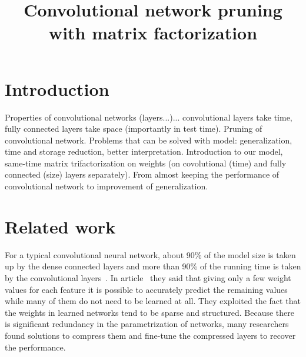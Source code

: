 \documentclass{article} %
\title{Convolutional network pruning with matrix factorization}
\begin{document}
\maketitle

\begin{abstract}

\end{abstract}

\section{Introduction}
Properties of convolutional networks (layers...)... convolutional layers take 
time, fully connected layers take space (importantly in test time). Pruning of 
convolutional network. Problems that can be solved with model: generalization, 
time and storage reduction, better interpretation. Introduction to our model, 
same-time matrix trifactorization on weights (on covolutional (time) and fully 
connected (size) layers separately). From almost keeping the performance of 
convolutional network to improvement of generalization.


\section{Related work}

For a typical convolutional neural network, about 90\% of the model size is 
taken up by the dense connected layers and more than 90\% of the running time is 
taken by the convolutional layers~\cite{zeiler2014visualizing}. In 
article~\cite{denil2013predicting} they said that giving only a few weight 
values for each feature it is possible to accurately predict the remaining 
values while many of them do not need to be learned at all. They exploited the 
fact that the weights in learned networks tend to be sparse and structured. 
Because there 
is significant redundancy in the parametrization of networks, many researchers 
found solutions to compress them and fine-tune the compressed layers to recover 
the performance. 
\end{document}
